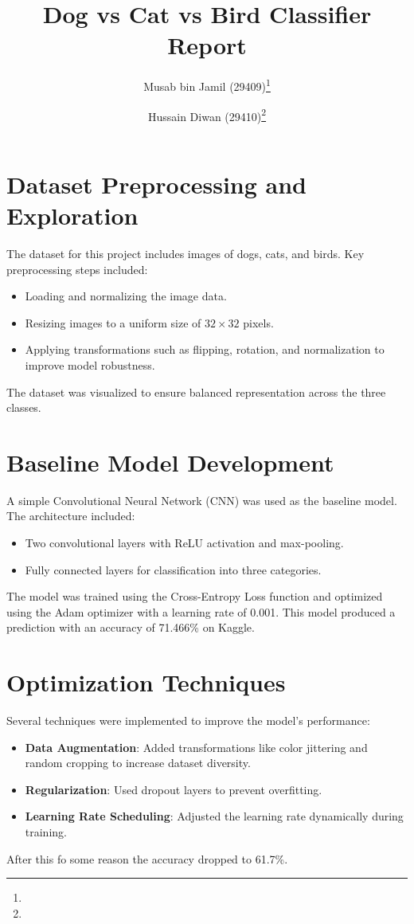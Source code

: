 \documentclass{article}
\title{Dog vs Cat vs Bird Classifier Report}
\author{
    Musab bin Jamil (29409)\thanks{} \and 
    Hussain Diwan (29410)\thanks{}
}
\begin{document}
\maketitle

\tableofcontents
\newpage

\section{Dataset Preprocessing and Exploration}
The dataset for this project includes images of dogs, cats, and birds. Key preprocessing steps included:
\begin{itemize}
    \item Loading and normalizing the image data.
    \item Resizing images to a uniform size of $32 \times 32$ pixels.
    \item Applying transformations such as flipping, rotation, and normalization to improve model robustness.
\end{itemize}
The dataset was visualized to ensure balanced representation across the three classes.

\section{Baseline Model Development}
A simple Convolutional Neural Network (CNN) was used as the baseline model. The architecture included:
\begin{itemize}
    \item Two convolutional layers with ReLU activation and max-pooling.
    \item Fully connected layers for classification into three categories.
\end{itemize}
The model was trained using the Cross-Entropy Loss function and optimized using the Adam optimizer with a learning rate of 0.001. This model produced a prediction with an accuracy of 71.466\% on Kaggle.

\section{Optimization Techniques}
Several techniques were implemented to improve the model's performance:
\begin{itemize}
    \item \textbf{Data Augmentation}: Added transformations like color jittering and random cropping to increase dataset diversity.
    \item \textbf{Regularization}: Used dropout layers to prevent overfitting.
    \item \textbf{Learning Rate Scheduling}: Adjusted the learning rate dynamically during training.
\end{itemize}
After this fo some reason the accuracy dropped to 61.7\%.
\end{document}
